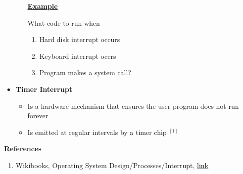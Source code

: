 \documentclass[12pt]{article}
\begin{document}
\begin{itemize}
\begin{itemize}
        \bigskip

        \underline{\textbf{Example}}

        \bigskip

        What code to run when

        \begin{enumerate}[1.]
            \item Hard disk interrupt occurs
            \item Keyboard interrupt occrs
            \item Program makes a system call?
        \end{enumerate}

    \end{itemize}

    \item \textbf{Timer Interrupt}

    \begin{itemize}
        \item Is a hardware mechanism that ensures the user program does not run forever
        \item Is emitted at regular intervals by a timer chip $^{[1]}$
    \end{itemize}
\end{itemize}

\bigskip

\underline{\textbf{References}}

\begin{enumerate}[1)]
    \item Wikibooks, Operating System Design/Processes/Interrupt, \href{https://en.wikibooks.org/wiki/Operating_System_Design/Processes/Interrupt#:~:text=Perhaps%20the%20most%20important%20interrupt,processor%20executing%20a%20specific%20instruction.}{link}
\end{enumerate}
\end{document}
